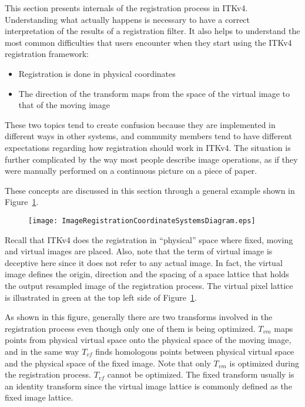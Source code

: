 This section presents internals of the registration process in ITKv4.
Understanding what actually happens is necessary to have a correct interpretation
of the results of a registration filter. It also helps to understand the
most common difficulties that users encounter when they start using the ITKv4
registration framework:

\begin{itemize}
\item Registration is done in physical coordinates
\item The direction of the transform maps from the space of the virtual image to that of the moving image
\end{itemize}

These two topics tend to create confusion because they
are implemented in different ways in other systems, and community members tend to
have different expectations regarding how registration should work in ITKv4. The
situation is further complicated by the way most people describe image
operations, as if they were manually performed on a continuous picture on a piece
of paper.

These concepts are discussed in this section through a general example shown in
Figure~\ref{fig:ImageRegistrationCoordinateSystemsDiagram}.

\begin{figure}
\centering
\texttt{[image: ImageRegistrationCoordinateSystemsDiagram.eps]}
\label{fig:ImageRegistrationCoordinateSystemsDiagram}
\end{figure}

Recall that ITKv4 does the registration in ``physical'' space where fixed,
moving and virtual images are placed. Also, note that the term of
virtual image is deceptive here since it does not refer to any actual
image. In fact, the virtual image defines the origin, direction and the
spacing of a space lattice that holds the output resampled image of the
registration process. The virtual pixel lattice is illustrated in green
at the top left side of
Figure~\ref{fig:ImageRegistrationCoordinateSystemsDiagram}.

As shown in this figure, generally there are two transforms involved in the
registration process even though only one of them is being optimized. $T_{vm}$
maps points from physical virtual space onto the physical space of the moving
image, and in the same way $T_{vf}$ finds homologous points between physical
virtual space and the physical space of the fixed image. Note that only
$T_{vm}$ is optimized during the registration process. $T_{vf}$ cannot be
optimized. The fixed transform usually is an identity transform since the
virtual image lattice is commonly defined as the fixed image lattice.

